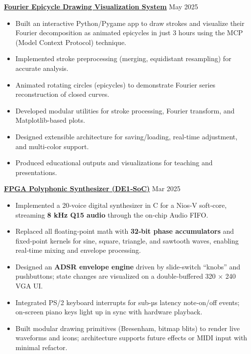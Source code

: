 \documentclass[a4paper,10pt]{article}
\begin{document}
\vspace{0.3cm}
\noindent\href{https://github.com/Ken-2511/Fourier-Epicycle-Draw}{\uline{
\textbf{Fourier Epicycle Drawing Visualization System}}} \hfill May 2025
\begin{itemize}[leftmargin=0.2in]
    \item Built an interactive Python/Pygame app to draw strokes and visualize their Fourier decomposition as animated epicycles in just 3 hours using the MCP (Model Context Protocol) technique.
    \item Implemented stroke preprocessing (merging, equidistant resampling) for accurate analysis.
    \item Animated rotating circles (epicycles) to demonstrate Fourier series reconstruction of closed curves.
    \item Developed modular utilities for stroke processing, Fourier transform, and Matplotlib-based plots.
    \item Designed extensible architecture for saving/loading, real-time adjustment, and multi-color support.
    \item Produced educational outputs and visualizations for teaching and presentations.
\end{itemize}

\vspace{0.3cm}
\noindent\href{https://github.com/alexzjm/ece243-sound-synthesizer}{\uline{
\textbf{FPGA Polyphonic Synthesizer (DE1‑SoC)}}} \hfill Mar 2025
\begin{itemize}[leftmargin=0.2in]
    \item Implemented a 20‑voice digital synthesizer in C for a Nios‑V soft‑core, streaming \textbf{8 kHz Q15 audio} through the on‑chip Audio FIFO.  
    \item Replaced all floating‑point math with \textbf{32‑bit phase accumulators} and fixed‑point kernels for sine, square, triangle, and sawtooth waves, enabling real‑time mixing and envelope processing.  
    \item Designed an \textbf{ADSR envelope engine} driven by slide‑switch “knobs” and pushbuttons; state changes are visualized on a double‑buffered 320 × 240 VGA UI.  
    \item Integrated PS/2 keyboard interrupts for sub‑µs latency note‑on/off events; on‑screen piano keys light up in sync with hardware playback.  
    \item Built modular drawing primitives (Bresenham, bitmap blits) to render live waveforms and icons; architecture supports future effects or MIDI input with minimal refactor.  
\end{itemize}
\end{document}
